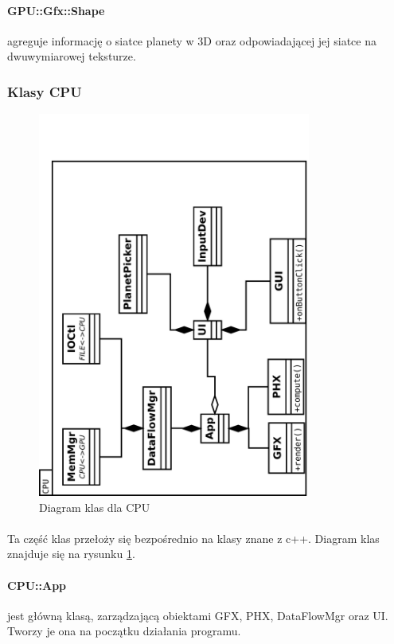 \paragraph{GPU::Gfx::Shape} agreguje informację o siatce planety w 3D oraz odpowiadającej jej siatce na dwuwymiarowej teksturze.

\subsubsection{Klasy CPU}

\begin{figure}[h]
	\centering
	\includegraphics[angle=270,width=0.8\textwidth]{class_cpu.pdf}
	\caption{Diagram klas dla CPU}
	\label{fig:class_cpu}
\end{figure}

\paragraph{}
Ta część klas przełoży się bezpośrednio na klasy znane z c++. Diagram klas znajduje się na rysunku \ref{fig:class_cpu}.

\paragraph{CPU::App} jest główną klasą, zarządzającą obiektami GFX, PHX, DataFlowMgr oraz UI. Tworzy je ona na początku działania programu.
